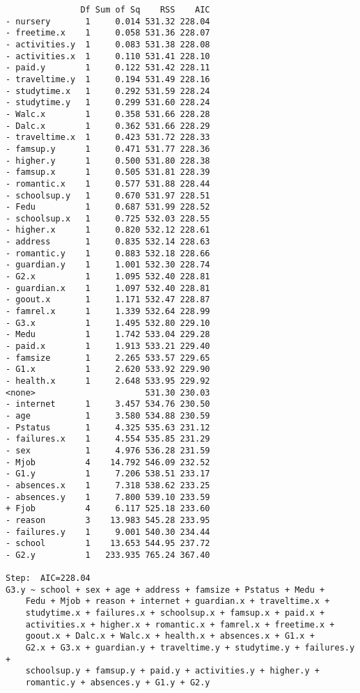 \documentclass[11pt]{article}
\begin{document}
\begin{enumerate}
\begin{verbatim}
               Df Sum of Sq    RSS    AIC
- nursery       1     0.014 531.32 228.04
- freetime.x    1     0.058 531.36 228.07
- activities.y  1     0.083 531.38 228.08
- activities.x  1     0.110 531.41 228.10
- paid.y        1     0.122 531.42 228.11
- traveltime.y  1     0.194 531.49 228.16
- studytime.x   1     0.292 531.59 228.24
- studytime.y   1     0.299 531.60 228.24
- Walc.x        1     0.358 531.66 228.28
- Dalc.x        1     0.362 531.66 228.29
- traveltime.x  1     0.423 531.72 228.33
- famsup.y      1     0.471 531.77 228.36
- higher.y      1     0.500 531.80 228.38
- famsup.x      1     0.505 531.81 228.39
- romantic.x    1     0.577 531.88 228.44
- schoolsup.y   1     0.670 531.97 228.51
- Fedu          1     0.687 531.99 228.52
- schoolsup.x   1     0.725 532.03 228.55
- higher.x      1     0.820 532.12 228.61
- address       1     0.835 532.14 228.63
- romantic.y    1     0.883 532.18 228.66
- guardian.y    1     1.001 532.30 228.74
- G2.x          1     1.095 532.40 228.81
- guardian.x    1     1.097 532.40 228.81
- goout.x       1     1.171 532.47 228.87
- famrel.x      1     1.339 532.64 228.99
- G3.x          1     1.495 532.80 229.10
- Medu          1     1.742 533.04 229.28
- paid.x        1     1.913 533.21 229.40
- famsize       1     2.265 533.57 229.65
- G1.x          1     2.620 533.92 229.90
- health.x      1     2.648 533.95 229.92
<none>                      531.30 230.03
- internet      1     3.457 534.76 230.50
- age           1     3.580 534.88 230.59
- Pstatus       1     4.325 535.63 231.12
- failures.x    1     4.554 535.85 231.29
- sex           1     4.976 536.28 231.59
- Mjob          4    14.792 546.09 232.52
- G1.y          1     7.206 538.51 233.17
- absences.x    1     7.318 538.62 233.25
- absences.y    1     7.800 539.10 233.59
+ Fjob          4     6.117 525.18 233.60
- reason        3    13.983 545.28 233.95
- failures.y    1     9.001 540.30 234.44
- school        1    13.653 544.95 237.72
- G2.y          1   233.935 765.24 367.40

Step:  AIC=228.04
G3.y ~ school + sex + age + address + famsize + Pstatus + Medu + 
    Fedu + Mjob + reason + internet + guardian.x + traveltime.x + 
    studytime.x + failures.x + schoolsup.x + famsup.x + paid.x + 
    activities.x + higher.x + romantic.x + famrel.x + freetime.x + 
    goout.x + Dalc.x + Walc.x + health.x + absences.x + G1.x + 
    G2.x + G3.x + guardian.y + traveltime.y + studytime.y + failures.y + 
    schoolsup.y + famsup.y + paid.y + activities.y + higher.y + 
    romantic.y + absences.y + G1.y + G2.y


\end{verbatim}
\end{enumerate}
\end{document}
